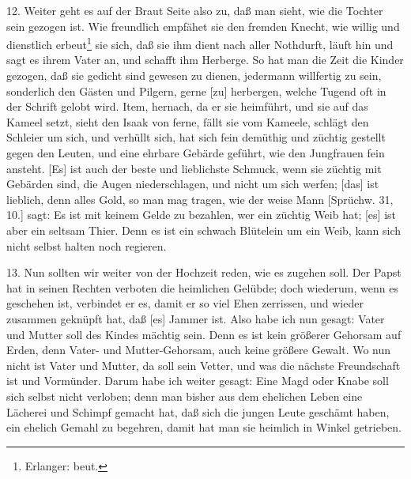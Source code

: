 12. Weiter geht es auf der Braut Seite also zu, daß man sieht, wie die Tochter sein gezogen ist. Wie freundlich empfähet sie den fremden Knecht, wie willig und dienstlich erbeut\footnote{Erlanger: beut.} sie sich, daß sie ihm dient nach aller Nothdurft, läuft hin und sagt es ihrem Vater an, und schafft ihm Herberge. So hat man die Zeit die Kinder gezogen, daß sie gedicht sind gewesen zu dienen, jedermann willfertig zu sein, sonderlich den Gästen und Pilgern, gerne [zu] herbergen, welche Tugend oft in der Schrift gelobt wird. Item, hernach, da er sie heimführt, und sie auf das Kameel setzt, sieht den Isaak von ferne, fällt sie vom Kameele, schlägt den Schleier um sich, und verhüllt sich, hat sich fein demüthig und züchtig gestellt gegen den Leuten, und eine ehrbare Gebärde geführt, wie den Jungfrauen fein ansteht. [Es] ist auch der beste und lieblichste Schmuck, wenn sie züchtig mit Gebärden sind, die Augen niederschlagen, und nicht um sich werfen; [das] ist lieblich, denn alles Gold, so man mag tragen, wie der weise Mann [Sprüchw. 31, 10.] sagt: Es ist mit keinem Gelde zu bezahlen, wer ein züchtig Weib hat; [es] ist aber ein seltsam Thier. Denn es ist ein schwach Blütelein um ein Weib, kann sich nicht selbst halten noch regieren.

13. Nun sollten wir weiter von der Hochzeit reden, wie es zugehen soll. Der Papst hat in seinen Rechten verboten die heimlichen Gelübde; doch wiederum, wenn es geschehen ist, verbindet er es, damit er so viel Ehen zerrissen, und wieder zusammen geknüpft hat, daß [es] Jammer ist. Also habe ich nun gesagt: Vater und Mutter soll des Kindes mächtig sein. Denn es ist kein größerer Gehorsam auf Erden, denn Vater- und Mutter-Gehorsam, auch keine größere Gewalt. Wo nun nicht ist Vater und Mutter, da soll sein Vetter, und was die nächste Freundschaft ist und Vormünder. Darum habe ich weiter gesagt: Eine Magd oder Knabe soll sich selbst nicht verloben; denn man bisher aus dem ehelichen Leben eine Lächerei und Schimpf gemacht hat, daß sich die jungen Leute geschämt haben, ein ehelich Gemahl zu begehren, damit hat man sie heimlich in Winkel getrieben.

